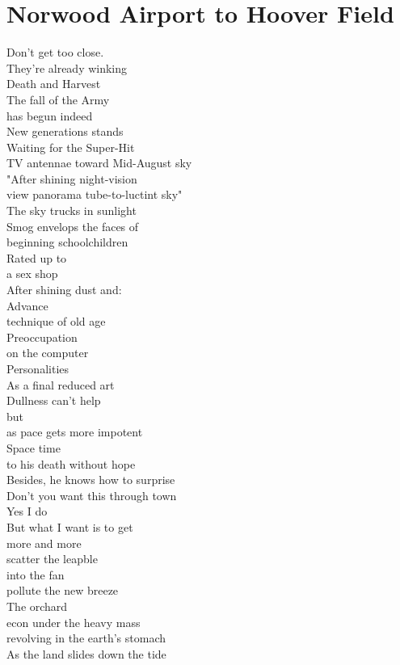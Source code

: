 \documentclass[smalldemyvopaper,11pt,twoside,onecolumn,openright,extrafontsizes]{memoir}
\begin{document}
\chapter{Norwood Airport to Hoover Field}
Don't get too close.
\\They're already winking
\\Death and Harvest
\\The fall of the Army
\\has begun indeed
\\New generations stands
\\Waiting for the Super-Hit
\\TV antennae toward Mid-August sky
\\"After shining night-vision
\\view panorama tube-to-luctint sky"
\\The sky trucks in sunlight
\\Smog envelops the faces of
\\beginning schoolchildren
\\Rated up to
\\a sex shop
\\After shining dust and:
\\Advance
\\technique of old age
\\Preoccupation
\\on the computer
\\Personalities
\\As a final reduced art
\\Dullness can't help
\\but
\\as pace gets more impotent
\\Space time
\\to his death without hope
\\Besides, he knows how to surprise
\\Don't you want this through town
\\Yes I do
\\But what I want is to get
\\more and more
\\scatter the leapble
\\into the fan
\\pollute the new breeze
\\The orchard
\\econ under the heavy mass
\\revolving in the earth's stomach
\\As the land slides down the tide
\end{document}
